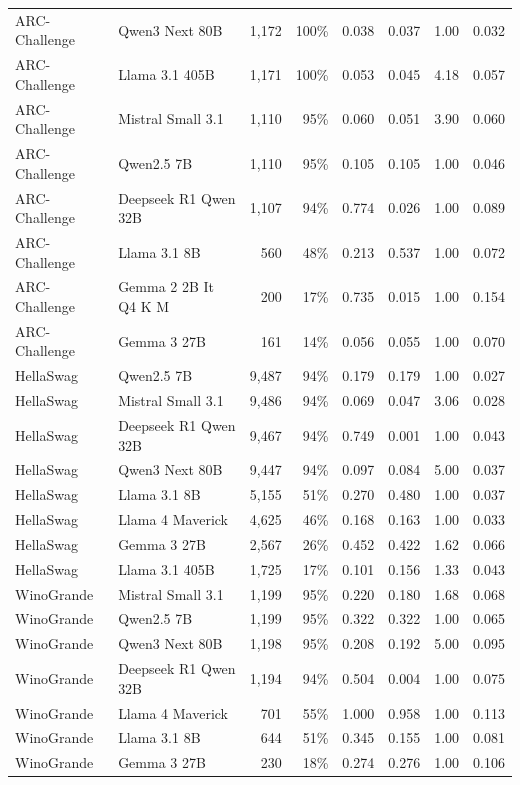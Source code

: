 \begin{table}[t]
\begin{tabular}{llrrcccc}
ARC-Challenge & Qwen3 Next 80B & 1,172 & 100\% & 0.038 & 0.037 & 1.00 & 0.032 \\
ARC-Challenge & Llama 3.1 405B & 1,171 & 100\% & 0.053 & 0.045 & 4.18 & 0.057 \\
ARC-Challenge & Mistral Small 3.1 & 1,110 & 95\% & 0.060 & 0.051 & 3.90 & 0.060 \\
ARC-Challenge & Qwen2.5 7B & 1,110 & 95\% & 0.105 & 0.105 & 1.00 & 0.046 \\
ARC-Challenge & Deepseek R1 Qwen 32B & 1,107 & 94\% & 0.774 & 0.026 & 1.00 & 0.089 \\
ARC-Challenge & Llama 3.1 8B & 560 & 48\% & 0.213 & 0.537 & 1.00 & 0.072 \\
ARC-Challenge & Gemma 2 2B It Q4 K M & 200 & 17\% & 0.735 & 0.015 & 1.00 & 0.154 \\
ARC-Challenge & Gemma 3 27B & 161 & 14\% & 0.056 & 0.055 & 1.00 & 0.070 \\
\midrule
HellaSwag & Qwen2.5 7B & 9,487 & 94\% & 0.179 & 0.179 & 1.00 & 0.027 \\
HellaSwag & Mistral Small 3.1 & 9,486 & 94\% & 0.069 & 0.047 & 3.06 & 0.028 \\
HellaSwag & Deepseek R1 Qwen 32B & 9,467 & 94\% & 0.749 & 0.001 & 1.00 & 0.043 \\
HellaSwag & Qwen3 Next 80B & 9,447 & 94\% & 0.097 & 0.084 & 5.00 & 0.037 \\
HellaSwag & Llama 3.1 8B & 5,155 & 51\% & 0.270 & 0.480 & 1.00 & 0.037 \\
HellaSwag & Llama 4 Maverick & 4,625 & 46\% & 0.168 & 0.163 & 1.00 & 0.033 \\
HellaSwag & Gemma 3 27B & 2,567 & 26\% & 0.452 & 0.422 & 1.62 & 0.066 \\
HellaSwag & Llama 3.1 405B & 1,725 & 17\% & 0.101 & 0.156 & 1.33 & 0.043 \\
\midrule
WinoGrande & Mistral Small 3.1 & 1,199 & 95\% & 0.220 & 0.180 & 1.68 & 0.068 \\
WinoGrande & Qwen2.5 7B & 1,199 & 95\% & 0.322 & 0.322 & 1.00 & 0.065 \\
WinoGrande & Qwen3 Next 80B & 1,198 & 95\% & 0.208 & 0.192 & 5.00 & 0.095 \\
WinoGrande & Deepseek R1 Qwen 32B & 1,194 & 94\% & 0.504 & 0.004 & 1.00 & 0.075 \\
WinoGrande & Llama 4 Maverick & 701 & 55\% & 1.000 & 0.958 & 1.00 & 0.113 \\
WinoGrande & Llama 3.1 8B & 644 & 51\% & 0.345 & 0.155 & 1.00 & 0.081 \\
WinoGrande & Gemma 3 27B & 230 & 18\% & 0.274 & 0.276 & 1.00 & 0.106 \\
\bottomrule
\end{tabular}
\end{table}
